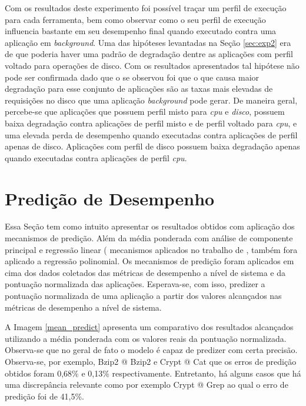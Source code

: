 Com os resultados deste experimento foi possível traçar um perfil de execução para cada ferramenta, bem como observar como o seu perfil de execução influencia bastante em seu desempenho final quando executado contra uma aplicação em \textit{background}. Uma das hipóteses levantadas na Seção \ref{sec:exp2} era de que poderia haver uma padrão de degradação dentre as aplicações com perfil voltado para operações de disco. Com os resultados apresentados tal hipótese não pode ser confirmada dado que o se observou foi que o que causa maior degradação para esse conjunto de aplicações são as taxas mais elevadas de requisições no disco que uma aplicação \textit{background} pode gerar. De maneira geral, percebe-se que aplicações que possuem perfil misto para \textit{cpu} e \textit{disco}, possuem baixa degradação contra aplicações de perfil misto e de perfil voltado para \textit{cpu}, e uma elevada perda de desempenho quando executadas contra aplicações de perfil apenas de disco. Aplicações com perfil de disco possuem baixa degradação apenas quando executadas contra aplicações de perfil \textit{cpu}. 

\section{Predição de Desempenho}
\label{sec:performance_predict} 
Essa Seção tem como intuito apresentar os resultados obtidos com aplicação dos mecanismos de predição. Além da média ponderada com análise de componente principal e regressão linear ( mecanismos aplicados no trabalho de , também fora aplicado a regressão polinomial. Os mecanismos de predição foram aplicados em cima dos dados coletados das métricas de desempenho a nível de sistema e da pontuação normalizada das aplicações. Esperava-se, com isso, predizer a pontuação normalizada de uma aplicação a partir dos valores alcançados nas métricas de desempenho a nível de sistema. 

A Imagem \ref{mean_predict} apresenta um comparativo dos resultados alcançados utilizando a média ponderada com os valores reais da pontuação normalizada. Observa-se que no geral de fato o modelo é capaz de predizer com certa precisão. Observa-se, por exemplo, Bzip2 @ Bzip2 e Crypt @ Cat que os erros de predição obtidos foram 0,68\% e 0,13\% respectivamente. Entretanto, há alguns casos que há uma discrepância relevante como por exemplo Crypt @ Grep ao qual o erro de predição foi de 41,5\%.   


